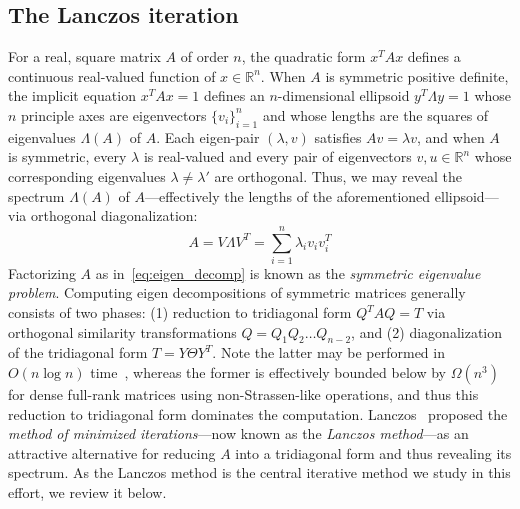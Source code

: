 \documentclass[10pt]{article}
\numberwithin{equation}{section}
\newcommand{\+}{%
	\raisebox{0.18ex}{\scaleobj{0.55}{+}}
}
\theoremstyle{definition}
\begin{document}
\subsection{The Lanczos iteration}
For a real, square matrix $A$ of order $n$, the quadratic form $x^T A x$ defines a continuous real-valued function of $x \in \mathbb{R}^n$. When $A$ is symmetric positive definite, the implicit equation $x^T A x = 1$ defines an $n$-dimensional ellipsoid $y^T \Lambda y = 1$ whose $n$ principle axes are eigenvectors $\{v_i\}_{i=1}^n$ and whose lengths are the squares of eigenvalues $\Lambda(A)$ of $A$.
Each eigen-pair $(\lambda, v)$ satisfies $A v = \lambda v$, and when $A$ is symmetric, every $\lambda$ is real-valued and every pair of eigenvectors $v, u \in \mathbb{R}^n$ whose corresponding eigenvalues $\lambda \neq \lambda'$ are orthogonal.  
Thus, we may reveal the spectrum $\Lambda(A)$ of $A$---effectively the lengths of the aforementioned ellipsoid---via orthogonal diagonalization:
\begin{equation}\label{eq:eigen_decomp}
	A = V \Lambda V^T = \sum\limits_{i=1}^n \lambda_i v_i v_i^T
\end{equation}
Factorizing $A$ as in~\eqref{eq:eigen_decomp} is known as the \emph{symmetric eigenvalue problem}. 
Computing eigen decompositions of symmetric matrices generally consists of two phases: (1) reduction to tridiagonal form $Q^T A Q = T$ via orthogonal similarity transformations $Q = Q_1 Q_2 \dots Q_{n-2}$, and (2) diagonalization of the tridiagonal form $T = Y \Theta Y^T$. 
Note the latter may be performed in $O(n \log n)$ time~\cite{gu1995divide}, whereas the former is effectively bounded below by $\Omega(n^3)$ for dense full-rank matrices using non-Strassen-like operations, and thus this reduction to tridiagonal form dominates the computation. 
Lanczos~\cite{lanczos1950iteration} proposed the \emph{method of minimized iterations}---now known as the \emph{Lanczos method}---as an attractive alternative for reducing $A$ into a tridiagonal form and thus revealing its spectrum. As the Lanczos method is the central iterative method we study in this effort, we review it below. 
\end{document}
